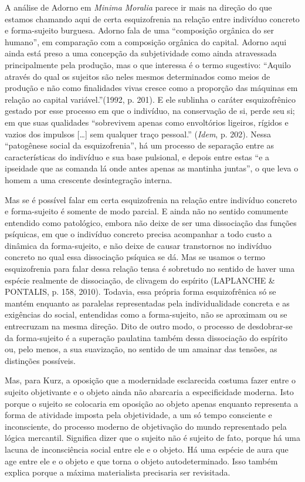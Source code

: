 A análise de Adorno em \emph{Minima Moralia} parece ir mais na direção
do que estamos chamando aqui de certa esquizofrenia na relação entre
indivíduo concreto e forma-sujeito burguesa. Adorno fala de uma
``composição orgânica do ser humano'', em comparação com a composição
orgânica do capital. Adorno aqui ainda está preso a uma concepção da
subjetividade como ainda atravessada principalmente pela produção, mas o
que interessa é o termo sugestivo: ``Aquilo através do qual os sujeitos
são neles mesmos determinados como meios de produção e não como
finalidades vivas cresce como a proporção das máquinas em relação ao
capital variável.''(1992, p. 201). E ele sublinha o caráter
esquizofrênico gestado por esse processo em que o indivíduo, na
conservação de si, perde seu si; em que suas qualidades ``sobrevivem
apenas como envoltórios ligeiros, rígidos e vazios dos impulsos
{[}\ldots{}{]} sem qualquer traço pessoal.'' (\emph{Idem}, p. 202).
Nessa ``patogênese social da esquizofrenia'', há um processo de
separação entre as características do indivíduo e sua base pulsional, e
depois entre estas ``e a ipseidade que as comanda lá onde antes apenas
as mantinha juntas'', o que leva o homem a uma crescente desintegração
interna.

Mas se é possível falar em certa esquizofrenia na relação entre
indivíduo concreto e forma-sujeito é somente de modo parcial. E ainda
não no sentido comumente entendido como patológico, embora não deixe de
ser uma dissociação das funções psíquicas, em que o indivíduo concreto
precisa acompanhar a todo custo a dinâmica da forma-sujeito, e não deixe
de causar transtornos no indivíduo concreto no qual essa dissociação
psíquica se dá. Mas se usamos o termo esquizofrenia para falar dessa
relação tensa é sobretudo no sentido de haver uma espécie realmente de
dissociação, de clivagem do espírito (LAPLANCHE \& PONTALIS, p. 158,
2010). Todavia, essa própria forma esquizofrênica só se mantém enquanto
as paralelas representadas pela individualidade concreta e as exigências
do social, entendidas como a forma-sujeito, não se aproximam ou se
entrecruzam na mesma direção. Dito de outro modo, o processo de
desdobrar-se da forma-sujeito é a superação paulatina também dessa
dissociação do espírito ou, pelo menos, a sua suavização, no sentido de
um amainar das tensões, as distinções possíveis.

Mas, para Kurz, a oposição que a modernidade esclarecida costuma fazer
entre o sujeito objetivante e o objeto ainda não abarcaria a
especificidade moderna. Isto porque o sujeito se colocaria em oposição
ao objeto apenas enquanto representa a forma de atividade imposta pela
objetividade, a um só tempo consciente e inconsciente, do processo
moderno de objetivação do mundo representado pela lógica mercantil.
Significa dizer que o sujeito não é sujeito de fato, porque há uma
lacuna de inconsciência social entre ele e o objeto. Há uma espécie de
aura que age entre ele e o objeto e que torna o objeto autodeterminado.
Isso também explica porque a máxima materialista precisaria ser
revisitada.

